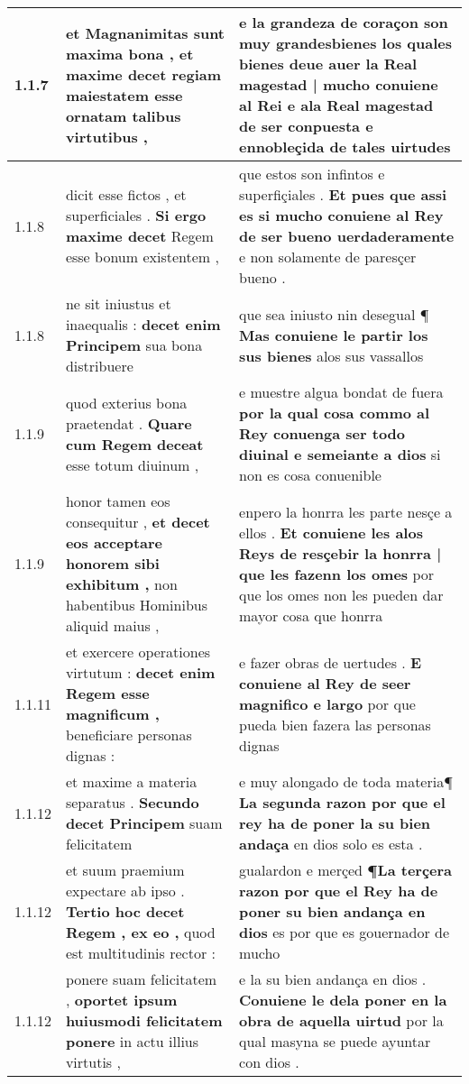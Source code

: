 \begin{tabular}{|p{1cm}|p{6.5cm}|p{6.5cm}|}
1.1.7 & et Magnanimitas sunt maxima bona , \textbf{ et maxime decet regiam maiestatem } esse ornatam talibus virtutibus , & e la grandeza de coraçon son muy grandesbienes \textbf{ los quales bienes deue auer la Real magestad | mucho conuiene al Rei } e ala Real magestad de ser conpuesta e ennobleçida de tales uirtudes \\\hline
1.1.8 & dicit esse fictos , et superficiales . \textbf{ Si ergo maxime decet } Regem esse bonum existentem , & que estos son infintos e superfiçiales . \textbf{ Et pues que assi es si mucho conuiene al Rey de ser bueno uerdaderamente } e non solamente de paresçer bueno . \\\hline
1.1.8 & ne sit iniustus et inaequalis : \textbf{ decet enim Principem } sua bona distribuere & que sea iniusto nin desegual ¶ \textbf{ Mas conuiene le partir los sus bienes } alos sus vassallos \\\hline
1.1.9 & quod exterius bona praetendat . \textbf{ Quare cum Regem deceat } esse totum diuinum , & e muestre algua bondat de fuera \textbf{ por la qual cosa commo al Rey conuenga ser todo diuinal e semeiante a dios } si non es cosa conuenible \\\hline
1.1.9 & honor tamen eos consequitur , \textbf{ et decet eos acceptare honorem sibi exhibitum , } non habentibus Hominibus aliquid maius , & enpero la honrra les parte nesçe a ellos . \textbf{ Et conuiene les alos Reys de resçebir la honrra | que les fazenn los omes } por que los omes non les pueden dar mayor cosa que honrra \\\hline
1.1.11 & et exercere operationes virtutum : \textbf{ decet enim Regem esse magnificum , } beneficiare personas dignas : & e fazer obras de uertudes . \textbf{ E conuiene al Rey de seer magnifico e largo } por que pueda bien fazera las personas dignas \\\hline
1.1.12 & et maxime a materia separatus . \textbf{ Secundo decet Principem } suam felicitatem & e muy alongado de toda materia¶ \textbf{ La segunda razon por que el rey ha de poner la su bien andaça } en dios solo es esta . \\\hline
1.1.12 & et suum praemium expectare ab ipso . \textbf{ Tertio hoc decet Regem , ex eo , } quod est multitudinis rector : & gualardon e merçed \textbf{ ¶La terçera razon por que el Rey ha de poner su bien andança en dios } es por que es gouernador de mucho \\\hline
1.1.12 & ponere suam felicitatem , \textbf{ oportet ipsum huiusmodi felicitatem ponere } in actu illius virtutis , & e la su bien andança en dios . \textbf{ Conuiene le dela poner en la obra de aquella uirtud } por la qual masyna se puede ayuntar con dios . \\\hline

\end{tabular}
